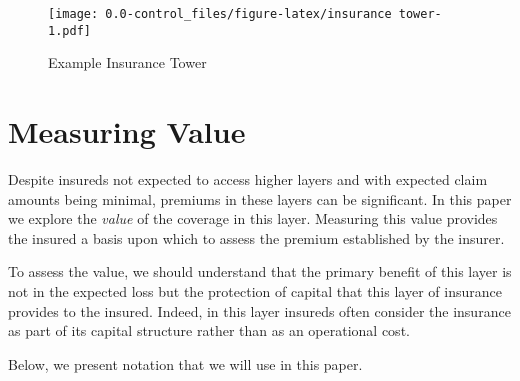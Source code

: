 \documentclass[
]{article}
\begin{document}
\begin{figure}
\centering
\texttt{[image: 0.0-control\_files/figure-latex/insurance tower-1.pdf]}
\caption{\label{fig:tower}Example Insurance Tower}
\end{figure}

\hypertarget{measuring-value}{%
\section{Measuring Value}\label{measuring-value}}

Despite insureds not expected to access higher layers and with expected
claim amounts being minimal, premiums in these layers can be
significant. In this paper we explore the \emph{value} of the coverage
in this layer. Measuring this value provides the insured a basis upon
which to assess the premium established by the insurer.

To assess the value, we should understand that the primary benefit of
this layer is not in the expected loss but the protection of capital
that this layer of insurance provides to the insured. Indeed, in this
layer insureds often consider the insurance as part of its capital
structure rather than as an operational cost.

\newpage

Below, we present notation that we will use in this paper.
\end{document}
